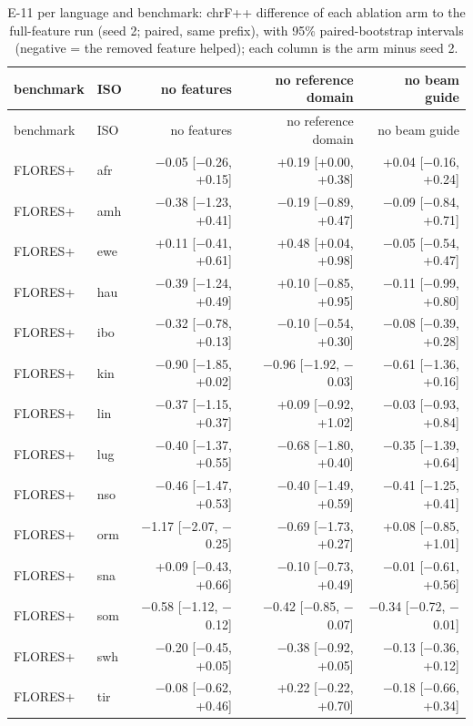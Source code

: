{\scriptsize\setlength{\tabcolsep}{1.5pt}
\begin{longtable}{@{}llrrr@{}}
\caption{E-11 per language and benchmark: chrF++ difference of each ablation arm to the full-feature run (seed 2; paired, same prefix), with 95\% paired-bootstrap intervals (negative = the removed feature helped); each column is the arm minus seed 2.}\label{tab:e11-per-language}\\
\toprule
benchmark & ISO & no features & no reference domain & no beam guide \\
\midrule\endfirsthead
\toprule
benchmark & ISO & no features & no reference domain & no beam guide \\
\midrule\endhead
\midrule\endfoot
\bottomrule\endlastfoot
FLORES+ & afr & $-$0.05 [$-$0.26, +0.15] & +0.19 [+0.00, +0.38] & +0.04 [$-$0.16, +0.24] \\
FLORES+ & amh & $-$0.38 [$-$1.23, +0.41] & $-$0.19 [$-$0.89, +0.47] & $-$0.09 [$-$0.84, +0.71] \\
FLORES+ & ewe & +0.11 [$-$0.41, +0.61] & +0.48 [+0.04, +0.98] & $-$0.05 [$-$0.54, +0.47] \\
FLORES+ & hau & $-$0.39 [$-$1.24, +0.49] & +0.10 [$-$0.85, +0.95] & $-$0.11 [$-$0.99, +0.80] \\
FLORES+ & ibo & $-$0.32 [$-$0.78, +0.13] & $-$0.10 [$-$0.54, +0.30] & $-$0.08 [$-$0.39, +0.28] \\
FLORES+ & kin & $-$0.90 [$-$1.85, +0.02] & $-$0.96 [$-$1.92, $-$0.03] & $-$0.61 [$-$1.36, +0.16] \\
FLORES+ & lin & $-$0.37 [$-$1.15, +0.37] & +0.09 [$-$0.92, +1.02] & $-$0.03 [$-$0.93, +0.84] \\
FLORES+ & lug & $-$0.40 [$-$1.37, +0.55] & $-$0.68 [$-$1.80, +0.40] & $-$0.35 [$-$1.39, +0.64] \\
FLORES+ & nso & $-$0.46 [$-$1.47, +0.53] & $-$0.40 [$-$1.49, +0.59] & $-$0.41 [$-$1.25, +0.41] \\
FLORES+ & orm & $-$1.17 [$-$2.07, $-$0.25] & $-$0.69 [$-$1.73, +0.27] & +0.08 [$-$0.85, +1.01] \\
FLORES+ & sna & +0.09 [$-$0.43, +0.66] & $-$0.10 [$-$0.73, +0.49] & $-$0.01 [$-$0.61, +0.56] \\
FLORES+ & som & $-$0.58 [$-$1.12, $-$0.12] & $-$0.42 [$-$0.85, $-$0.07] & $-$0.34 [$-$0.72, $-$0.01] \\
FLORES+ & swh & $-$0.20 [$-$0.45, +0.05] & $-$0.38 [$-$0.92, +0.05] & $-$0.13 [$-$0.36, +0.12] \\
FLORES+ & tir & $-$0.08 [$-$0.62, +0.46] & +0.22 [$-$0.22, +0.70] & $-$0.18 [$-$0.66, +0.34] \\

\end{longtable}}
